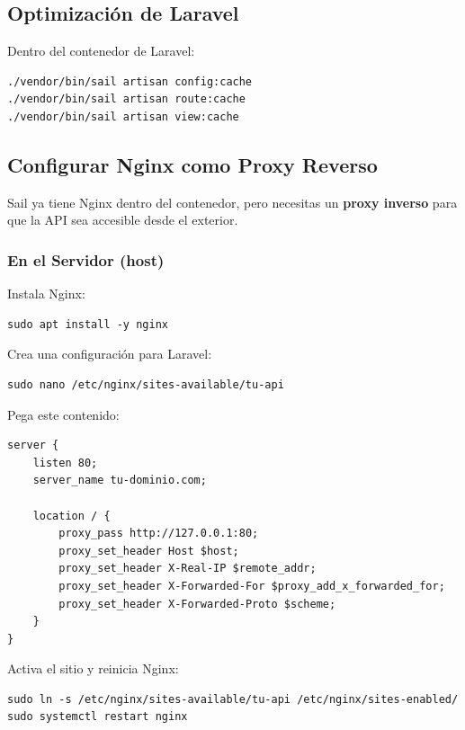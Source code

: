 \documentclass[11pt]{article}
\begin{document}
\subsection{Optimización de Laravel}
\label{sec:orgdbbde4b}

Dentro del contenedor de Laravel:

\begin{verbatim}
./vendor/bin/sail artisan config:cache
./vendor/bin/sail artisan route:cache
./vendor/bin/sail artisan view:cache
\end{verbatim}

\subsection{Configurar Nginx como Proxy Reverso}
\label{sec:org3d9b2a3}

Sail ya tiene Nginx dentro del contenedor, pero necesitas un \textbf{\textbf{proxy
inverso}} para que la API sea accesible desde el exterior.

\subsubsection*{En el Servidor (host)}
\label{sec:orgefb721d}
Instala Nginx:

\begin{verbatim}
sudo apt install -y nginx
\end{verbatim}

Crea una configuración para Laravel:

\begin{verbatim}
sudo nano /etc/nginx/sites-available/tu-api
\end{verbatim}

Pega este contenido:

\begin{verbatim}
server {
    listen 80;
    server_name tu-dominio.com;

    location / {
        proxy_pass http://127.0.0.1:80;
        proxy_set_header Host $host;
        proxy_set_header X-Real-IP $remote_addr;
        proxy_set_header X-Forwarded-For $proxy_add_x_forwarded_for;
        proxy_set_header X-Forwarded-Proto $scheme;
    }
}
\end{verbatim}

Activa el sitio y reinicia Nginx:

\begin{verbatim}
sudo ln -s /etc/nginx/sites-available/tu-api /etc/nginx/sites-enabled/
sudo systemctl restart nginx
\end{verbatim}
\end{document}
